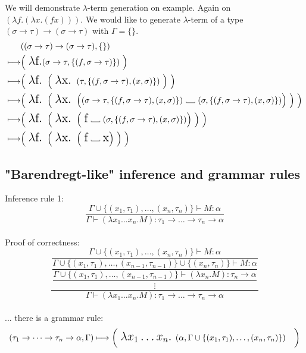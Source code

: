 \documentclass[12pt,a4paper]{report}
\newcommand{\lterm}{$\lambda$-term\xspace}
\newcommand\Vtextvisiblespace[1][.3em]{%
  \mbox{\kern.06em\vrule height.3ex}%
  \vbox{\hrule width#1}%
  \hbox{\vrule height.3ex}}
\begin{document}
We will demonstrate \lterm generation on example. 
Again on $(\lambda f . (\lambda x . (f x) ))$. 
We would like to generate \lterm of a type 
$(\sigma \rightarrow \tau) \rightarrow (\sigma \rightarrow \tau)$
with $\Gamma = \{\}$.
\begin{align*}
	& ((\sigma \rightarrow \tau) \rightarrow (\sigma \rightarrow \tau),\{\}) \\ 
	\longmapsto & \Big( \mbox{ {\Large $\lambda$f.}}
	  ( \sigma \rightarrow \tau , \{ (f,\sigma \rightarrow \tau) \} ) 
	~ \Big)
	\\
	\longmapsto & 
	\Big( \mbox{ {\Large $\lambda$f. }}
		\Big( \mbox{ {\Large $\lambda$x. }}
	  	 	( \tau , \{ (f,\sigma \rightarrow \tau) , (x,\sigma) \} ) 
		~ \Big)  	 
	~ \Big)
	\\
	\longmapsto & 
	\Big( \mbox{ {\Large $\lambda$f. }}
		\Big( \mbox{ {\Large $\lambda$x. }}	  	 	
	  	 	\Big( 
	  	 	  ( \sigma \rightarrow \tau , \{ (f,\sigma \rightarrow \tau) , (x,\sigma) \} ) 
			  \mbox{ \Vtextvisiblespace[1em] } 
			  ( \sigma , \{ (f,\sigma \rightarrow \tau) , (x,\sigma) \} )  \Big) 
		~ \Big)  	 
	 ~ \Big)
	\\
	\longmapsto & 
	\Big( \mbox{ {\Large $\lambda$f. }}
		\Big( \mbox{ {\Large $\lambda$x. }}	  	 	
	  	 	\Big( 
	  	 	  \mbox{ {\Large f}} 
			  \mbox{ \Vtextvisiblespace[1em] } 
			  ( \sigma , \{ (f,\sigma \rightarrow \tau) , (x,\sigma) \} ) \Big) 
		~ \Big)  	 
	~ \Big)		
	\\
	\longmapsto & 
	\Big( \mbox{ {\Large $\lambda$f. }}
		\Big( \mbox{ {\Large $\lambda$x. }}	  	 	
	  	 	\Big( 
	  	 	  \mbox{ {\Large f}} 
			  \mbox{ \Vtextvisiblespace[1em] } 
			  \mbox{{\Large x}} \Big) 
		~ \Big)  	 
	~ \Big)
\end{align*}

\subsection{"Barendregt-like" inference and grammar rules}
\label{barlike}

Inference rule 1: 
\[
	\frac{\Gamma \cup \{ (x_1,\tau_1),\dots,(x_n,\tau_n) \} \vdash M : \alpha }
	     {\Gamma \vdash (\lambda x_1 \dots x_n . M) : 
	     \tau_1 \rightarrow \dots \rightarrow \tau_n \rightarrow \alpha }
\]
\\
Proof of correctness:
\[
	\dfrac{
		\dfrac
		 {\Gamma \cup \{ (x_1,\tau_1),\dots,(x_n,\tau_n) \} \vdash M : \alpha}
		 {\dfrac
		   {\Gamma \cup \{ (x_1,\tau_1),\dots,(x_{n-1},\tau_{n-1})\} \cup 
		                \{(x_n,\tau_n) \} \vdash M : \alpha}
		   {\dfrac{\Gamma \cup \{ (x_1,\tau_1),\dots,(x_{n-1},\tau_{n-1})\}  
		                \vdash (\lambda x_n . M) : \tau_n \rightarrow \alpha}
				  { \vdots }		   
		   }
		 }		 
	 }
	     {\Gamma \vdash (\lambda x_1 \dots x_n . M) : 
	     \tau_1 \rightarrow \dots \rightarrow \tau_n \rightarrow \alpha }
\]
\\
... there is a grammar rule:
\[ 
	( \tau_1 \rightarrow \dots \rightarrow \tau_n \rightarrow \alpha , \Gamma )  \longmapsto
	\bigg( \mbox{ {\Large 
	$\lambda x_1 \dots x_n .$ 
	}}( \alpha , \Gamma \cup \{ (x_1,\tau_1),\dots,(x_n,\tau_n) \} ) \quad \bigg)
\]
\\
\end{document}
